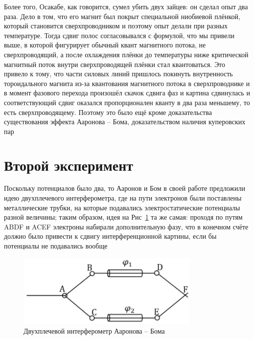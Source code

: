 \documentclass[a4paper, 14pt]{article}
\begin{document}
    Более того, Осакабе, как говорится, сумел убить двух зайцев: он сделал опыт два раза.
    Дело в том, что его магнит был покрыт специальной ниобиевой плёнкой, который становится сверхпроводником и поэтому
    опыт делали при разных температуре.
    Тогда сдвиг полос согласовывался с формулой, что мы привели выше, в которой фигурирует обычный квант магнитного
    потока, не сверхпроводящий, а после охлаждения плёнки до температуры ниже критической магнитный поток внутри
    сверхпроводящей плёнки стал квантоваться.
    Это привело к тому, что части силовых линий пришлось покинуть внутренность тороидального магнита из-за
    квантования магнитного потока в сверхпроводнике и в момент фазового перехода произошёл скачок сдвига фаз и картина
    сдвинулась и соответствующий сдвиг оказался пропорционален кванту в два раза меньшему, то есть сверхпроводящему.
    Поэтому это было ещё кроме доказательства существования эффекта Ааронова -- Бома, доказательством наличия
    куперовских пар
    
    \section*{Второй эксперимент} 
    
    Поскольку потенциалов было два, то Ааронов и Бом в своей работе предложили идею двухплечевого интерферометра,
    где на пути электронов были поставлены металлические трубки, на которые подавались электростатические потенциалы
    разной величины; таким образом, идея на Рис~\ref{fig:exp4} та же самая: проходя по путям ABDF и ACEF электроны
    набирали дополнительную фазу, что в конечном счёте должно было привести к сдвигу интерференционной картины, если
    бы потенциалы не подавались вообще
    
    \begin{figure}[h]
        \centering
        \includegraphics[width=0.8\textwidth]{exp4}
        \caption{Двухплечевой интерферометр Ааронова -- Бома}
        \label{fig:exp4}
    \end{figure}
    
\end{document}
